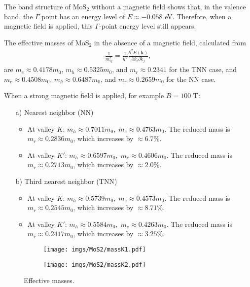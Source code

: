 \documentclass{article}
\begin{document}
The band structure of MoS$_{2}$ without a magnetic field shows that, in the valence band, the $\Gamma$ point has an energy level of $E \approx -0.058$ eV. Therefore, when a magnetic field is applied, this $\Gamma$-point energy level still appears.  

The effective masses of MoS$_{2}$ in the absence of a magnetic field, calculated from 
\begin{gather}
	\frac{1}{m_{ij}^{*}} = \frac{1}{\hbar^{2}} \frac{\partial^{2} E(\mathbf{k})}{\partial k_{i}\partial k_{j}},
\end{gather}
are $m_{e} \approx 0.4178 m_{0}$, $m_{h} \approx 0.5325 m_{0}$, and $m_{r} \approx 0.2341$ for the TNN case, and $m_{e} \approx 0.4508 m_{0}$, $m_{h} \approx 0.6487 m_{0}$, and $m_{r} \approx 0.2659 m_{0}$ for the NN case.  

When a strong magnetic field is applied, for example $B = 100$ T:  

\begin{itemize}
	\item[a)] Nearest neighbor (NN)
	\begin{itemize}
		\item At valley $K$: $m_{h} \approx 0.7011 m_{0},\; m_{e} \approx 0.4763 m_{0}$.  
		The reduced mass is $m_{r} \approx 0.2836 m_{0}$, which increases by $\approx 6.7\%$. 
		
		\item At valley $K'$: $m_{h} \approx 0.6597 m_{0},\; m_{e} \approx 0.4606 m_{0}$.  
		The reduced mass is $m_{r} \approx 0.2713 m_{0}$, which increases by $\approx 2.0\%$. 
	\end{itemize}
	\item[b)] Third nearest neighbor (TNN)
	\begin{itemize}
		\item At valley $K$: $m_{h} \approx 0.5739 m_{0},\; m_{e} \approx 0.4573 m_{0}$.  
		The reduced mass is $m_{r} \approx 0.2545 m_{0}$, which increases by $\approx 8.71\%$. 
		
		\item At valley $K'$: $m_{h} \approx 0.5584 m_{0},\; m_{e} \approx 0.4263 m_{0}$.  
		The reduced mass is $m_{r} \approx 0.2417 m_{0}$, which increases by $\approx 3.25\%$. 
	\end{itemize}
\end{itemize}

\begin{figure}[htb]
	\begin{subfigure}{0.495\textwidth}
		\centering
		\texttt{[image: imgs/MoS2/massK1.pdf]}
	\end{subfigure}
	\begin{subfigure}{0.495\textwidth}
		\centering
		\texttt{[image: imgs/MoS2/massK2.pdf]}
	\end{subfigure}
	\caption{Effective masses.}
\end{figure}
\end{document}
